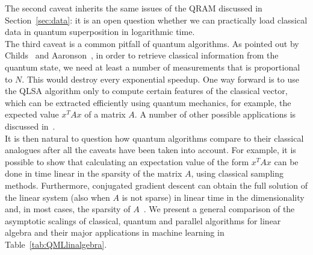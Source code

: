 \documentclass[a4paper, 11pt]{article}
\renewcommand{\arraystretch}{1.5}
\begin{document}
The second caveat inherits the same issues of the QRAM discussed in Section~\ref{sec:data}: it is an open question whether we can practically load classical data in quantum superposition in logarithmic time. \\

The third caveat is a common pitfall of quantum algorithms. As pointed out by Childs~\cite{childs2009quantum} and Aaronson~\cite{aaronson2015read}, in order to  retrieve classical information from the quantum state, we need at least a number of measurements that is proportional to $N$. This would destroy every exponential speedup. One way forward is to use the QLSA algorithm only to compute certain features of the classical vector, which can be extracted efficiently using quantum mechanics, for example, the expected value $x^T A x$ of a matrix $A$. A number of other possible applications is discussed in~\cite{aaronson2015read}.\\

It is then natural to question how quantum algorithms compare to their classical analogues after all the caveats have been taken into account. For example, it is possible to show that calculating an expectation value of the form $x^T A x$ can be done in time linear in the sparsity of the matrix $A$, using classical sampling methods. Furthermore, conjugated gradient descent can obtain the full solution of the linear system (also when $A$ is not sparse) in linear time in the dimensionality and, in most cases, the sparsity of $A$~\cite{shewchuk1994introduction}. We present a general comparison of the asymptotic scalings of classical, quantum and parallel algorithms for linear algebra and their major applications in machine learning in Table~\ref{tab:QMLlinalgebra}.\\

\newcommand{\specialcell}[2][l]{\begin{tabular}[#1]{@{}l@{}}#2\end{tabular}}
\newcommand{\ra}[1]{\renewcommand{\arraystretch}{#1}}
\end{document}
